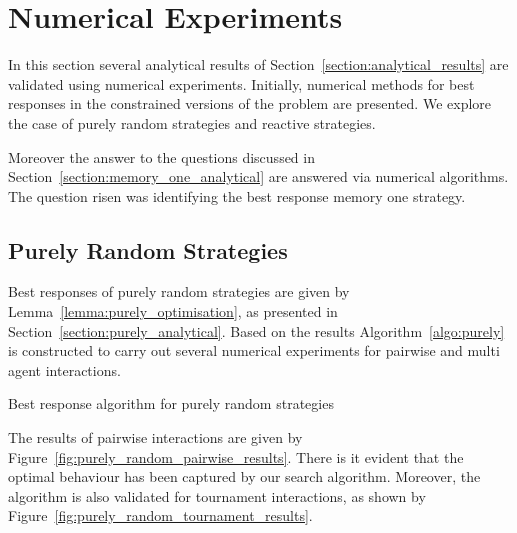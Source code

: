 \documentclass[10pt]{article}
\makeatletter
\def\BState{\State\hskip-\ALG@thistlm}
\makeatother
\begin{document}
\section{Numerical Experiments}

In this section several analytical results of Section~\ref{section:analytical_results}
are validated using numerical experiments.
Initially, numerical methods for best responses in the constrained versions of
the problem are presented. We explore the case of purely random strategies
and reactive strategies.

Moreover the answer to the questions discussed in Section~\ref{section:memory_one_analytical}
are answered via numerical algorithms. The question risen was identifying the best
response memory one strategy.

\subsection{Purely Random Strategies}

Best responses of purely random strategies are given by Lemma~\ref{lemma:purely_optimisation},
as presented in Section~\ref{section:purely_analytical}. Based on the results
Algorithm~\ref{algo:purely} is constructed to carry out several numerical experiments
for pairwise and multi agent interactions.

\begin{algorithm}
    \caption{Best response algorithm for purely random strategies}\label{algo:purely}
    \end{algorithm}

The results of pairwise interactions are given by Figure~\ref{fig:purely_random_pairwise_results}.
There is it evident that the optimal behaviour has been captured by our search algorithm.
Moreover, the algorithm is also validated for tournament interactions, as shown
by Figure~\ref{fig:purely_random_tournament_results}.
\end{document}
